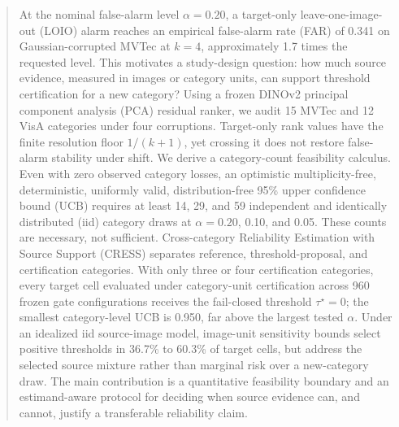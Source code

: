 \begin{abstract}
At the nominal false-alarm level $\alpha=0.20$, a target-only leave-one-image-out (LOIO) alarm reaches an empirical false-alarm rate (FAR) of 0.341 on Gaussian-corrupted MVTec at $k=4$, approximately 1.7 times the requested level. This motivates a study-design question: how much source evidence, measured in images or category units, can support threshold certification for a new category? Using a frozen DINOv2 principal component analysis (PCA) residual ranker, we audit 15 MVTec and 12 VisA categories under four corruptions. Target-only rank values have the finite resolution floor $1/(k{+}1)$, yet crossing it does not restore false-alarm stability under shift. We derive a category-count feasibility calculus. Even with zero observed category losses, an optimistic multiplicity-free, deterministic, uniformly valid, distribution-free 95\% upper confidence bound (UCB) requires at least 14, 29, and 59 independent and identically distributed (iid) category draws at $\alpha=0.20$, 0.10, and 0.05. These counts are necessary, not sufficient. Cross-category Reliability Estimation with Source Support (CRESS) separates reference, threshold-proposal, and certification categories. With only three or four certification categories, every target cell evaluated under category-unit certification across 960 frozen gate configurations receives the fail-closed threshold $\tau^\star=0$; the smallest category-level UCB is 0.950, far above the largest tested $\alpha$. Under an idealized iid source-image model, image-unit sensitivity bounds select positive thresholds in 36.7\% to 60.3\% of target cells, but address the selected source mixture rather than marginal risk over a new-category draw. The main contribution is a quantitative feasibility boundary and an estimand-aware protocol for deciding when source evidence can, and cannot, justify a transferable reliability claim.
\end{abstract}
